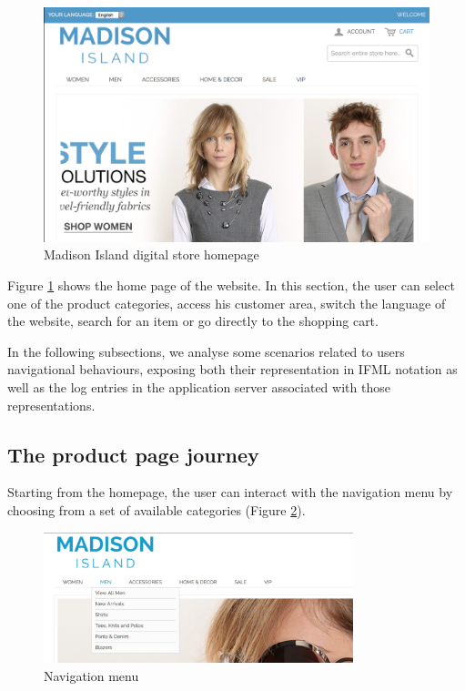 \vspace{0.5cm}
\begin{figure}[htbp]
  \centering
    \includegraphics[width=12cm]{images/home.png}
  \caption{Madison Island digital store homepage}
  \label{fig:home}
\end{figure}
\vspace{0.5cm}


Figure \ref{fig:home} shows the home page of the website. In this section, the user can select one of the product categories, access his customer area, switch the language of the website, search for an item or go directly to the shopping cart. 

In the following subsections, we analyse some scenarios related to users navigational behaviours, exposing both their representation in IFML notation as well as the log entries in the application server associated with those representations.

\newpage
\subsection{The product page journey}
\label{the-product-page-journey}

Starting from the homepage, the user can interact with the navigation menu by choosing from a set of available categories  (Figure \ref{fig:navigation}).

\vspace{0.5cm}
\begin{figure}[H]
  \centering
    \includegraphics[width=9cm]{images/madison/navigation.png}
  \caption{Navigation menu}
  \label{fig:navigation}
\end{figure}
\vspace{0.5cm}

